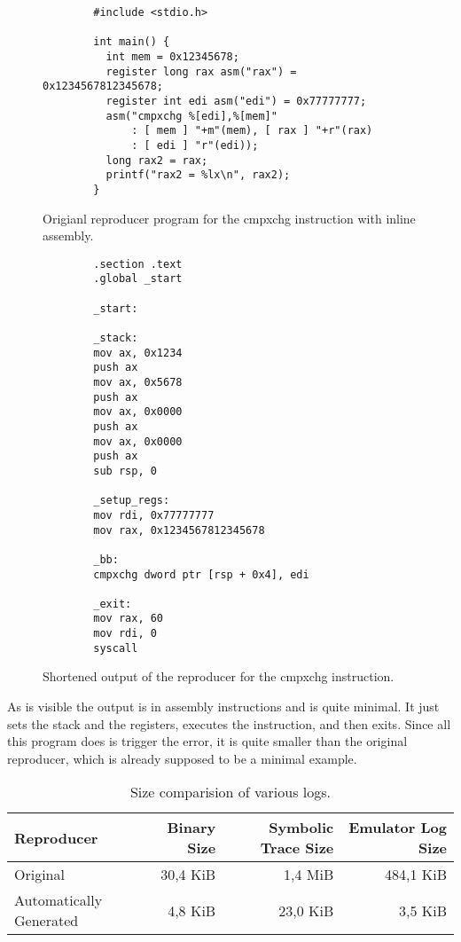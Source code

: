 \begin{figure}[ht]
    \centering
    \begin{verbatim}
        #include <stdio.h>

        int main() {
          int mem = 0x12345678;
          register long rax asm("rax") = 0x1234567812345678;
          register int edi asm("edi") = 0x77777777;
          asm("cmpxchg %[edi],%[mem]"
              : [ mem ] "+m"(mem), [ rax ] "+r"(rax)
              : [ edi ] "r"(edi));
          long rax2 = rax;
          printf("rax2 = %lx\n", rax2);
        }
    \end{verbatim}
    \caption{Origianl reproducer program for the cmpxchg instruction with inline assembly.}
    \label{fig:c}
\end{figure}

\begin{figure}[ht]
    \centering
    \begin{verbatim}       
        .section .text
        .global _start
        
        _start:
        
        _stack:
        mov ax, 0x1234
        push ax
        mov ax, 0x5678
        push ax
        mov ax, 0x0000
        push ax
        mov ax, 0x0000
        push ax
        sub rsp, 0
        
        _setup_regs:
        mov rdi, 0x77777777
        mov rax, 0x1234567812345678
        
        _bb:
        cmpxchg dword ptr [rsp + 0x4], edi
        
        _exit:
        mov rax, 60
        mov rdi, 0
        syscall
    \end{verbatim}
    \caption{Shortened output of the reproducer for the cmpxchg instruction.}
    \label{fig:gas}
\end{figure}

As is visible the output is in assembly instructions and is quite minimal.
It just sets the stack and the registers, executes the instruction, and then exits.
Since all this program does is trigger the error, it is quite smaller than the original reproducer, which is already supposed to be a minimal example.

\begin{table}[htpb]
    \caption[Example table]{Size comparision of various logs.}\label{tab:log}
    \centering
    \begin{tabular}{l r r r}
      \toprule
        Reproducer & Binary Size & Symbolic Trace Size & Emulator Log Size \\
      \midrule
        Original & 30,4 KiB & 1,4 MiB & 484,1 KiB \\
        Automatically Generated & 4,8 KiB & 23,0 KiB & 3,5 KiB \\
      \bottomrule
    \end{tabular}
\end{table}

